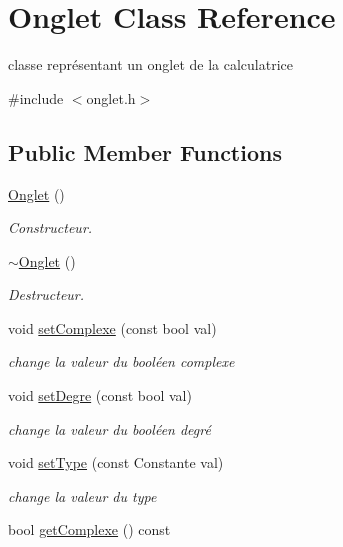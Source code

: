 \hypertarget{classOnglet}{
\section{Onglet Class Reference}
\label{classOnglet}
}


classe représentant un onglet de la calculatrice  




{\ttfamily \#include $<$onglet.h$>$}

\subsection*{Public Member Functions}
\begin{DoxyCompactItemize}
\item 
\hyperlink{classOnglet_ad0388b0a300edfeab063166f4fa44e25}{Onglet} ()
\begin{DoxyCompactList}\small\item\em Constructeur. \item\end{DoxyCompactList}\item 
\hyperlink{classOnglet_a717d9bd0139081b4e779f552c835b0f5}{$\sim$Onglet} ()
\begin{DoxyCompactList}\small\item\em Destructeur. \item\end{DoxyCompactList}\item 
void \hyperlink{classOnglet_ab1cadfd837be3e849bca41691cb0b856}{setComplexe} (const bool val)
\begin{DoxyCompactList}\small\item\em change la valeur du booléen complexe \item\end{DoxyCompactList}\item 
void \hyperlink{classOnglet_a534eb5c74e28ccd52c97f5ee69cb7d93}{setDegre} (const bool val)
\begin{DoxyCompactList}\small\item\em change la valeur du booléen degré \item\end{DoxyCompactList}\item 
void \hyperlink{classOnglet_aefe162f23f7d169c8a46daa08dfc0ccb}{setType} (const Constante val)
\begin{DoxyCompactList}\small\item\em change la valeur du type \item\end{DoxyCompactList}\item 
\hypertarget{classOnglet_a2a57b8bf73cef860d8f41bafcfd10d4d}{
bool \hyperlink{classOnglet_a2a57b8bf73cef860d8f41bafcfd10d4d}{getComplexe} () const }
\label{classOnglet_a2a57b8bf73cef860d8f41bafcfd10d4d}


\end{DoxyCompactItemize}
